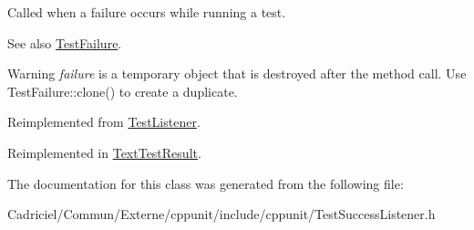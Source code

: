 Called when a failure occurs while running a test. 

\begin{DoxySeeAlso}{See also}
\hyperlink{class_test_failure}{Test\+Failure}. 
\end{DoxySeeAlso}
\begin{DoxyWarning}{Warning}
{\itshape failure} is a temporary object that is destroyed after the method call. Use Test\+Failure\+::clone() to create a duplicate. 
\end{DoxyWarning}


Reimplemented from \hyperlink{class_test_listener_a103216a5814c907f7b752b969477e765}{Test\+Listener}.



Reimplemented in \hyperlink{class_text_test_result_a05d3b0e8e51b3430092166bbc3d17708}{Text\+Test\+Result}.



The documentation for this class was generated from the following file\+:\begin{DoxyCompactItemize}
\item 
Cadriciel/\+Commun/\+Externe/cppunit/include/cppunit/Test\+Success\+Listener.\+h\end{DoxyCompactItemize}

